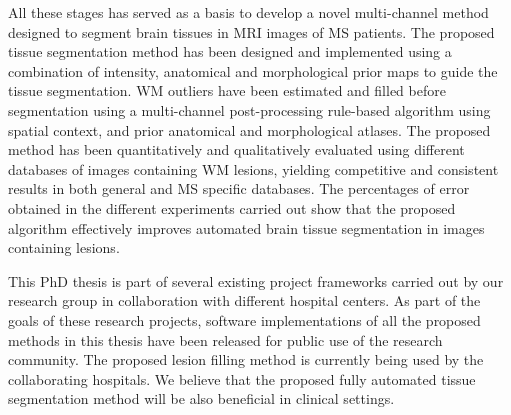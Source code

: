 All these stages has served as a basis to develop a novel multi-channel method designed to segment brain tissues in MRI images of MS patients. The proposed tissue segmentation method has been designed and implemented using a combination of intensity, anatomical and morphological prior maps to guide the tissue segmentation. WM outliers have been estimated and filled before segmentation using a multi-channel post-processing rule-based algorithm using spatial context, and prior anatomical and morphological atlases. The proposed method has been quantitatively and qualitatively evaluated using different databases of images containing WM lesions, yielding competitive and consistent results in both general and MS specific databases. The percentages of error obtained in the different experiments carried out show that the proposed algorithm effectively improves automated brain tissue segmentation in images containing lesions. 

This PhD thesis is part of several existing project frameworks carried out by our research group in collaboration with different hospital centers. As part of the goals of these research projects, software implementations of all the proposed methods in this thesis have been released for public use of the research community. The proposed lesion filling method is currently being used by the collaborating hospitals. We believe that the proposed fully automated tissue segmentation method will be also beneficial in clinical settings.  










